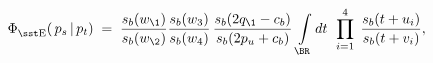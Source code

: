 \begin{equation}\label{fuscoeff1}\begin{aligned}
\Phi_{\rm\sst E}^{}(\,p_s\,|\,p_t)\;=\;
\frac{s_b(w_\1)}{s_b(w_\2)}\frac{s_b(w_3)}{s_b(w_4)}\,
\frac{s_b(2q_\1-c_b)}{s_b(2p_u+c_b)}\,
\int\limits_{\BR}dt\;\,\prod_{i=1}^4\;\frac{s_b(t+u_i)}{s_b(t+v_i)},
\end{aligned}\end{equation}

